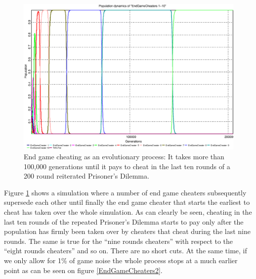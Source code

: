\begin{figure}
\begin{center}
\includegraphics[width=20cm]{images/EndGameCheaters_1-10.eps}
\caption{\label{EndGameCheaters1} End game cheating as an evolutionary process:
It takes more than 100,000 generations until it pays to cheat in the last ten
rounds of a 200 round reiterated Prisoner's Dilemma.}
\end{center}
\end{figure}

Figure \ref{EndGameCheaters1} shows a simulation where a number of end game
cheaters subsequently supersede each other until finally the end game
cheater that starts the earliest to cheat has taken over the whole simulation.
As can clearly be seen, cheating in the last ten rounds of the repeated
Prisoner's Dilemma starts to pay only after the population has firmly been
taken over by cheaters that cheat during the last nine rounds. The same is
true for the ``nine rounds cheaters'' with respect to the ``eight rounds
cheaters'' and so on. There are no short cuts. At the same time, if
we only allow for 1\% of game noise the whole process stops at a much earlier
point as can be seen on figure \ref{EndGameCheaters2}.

